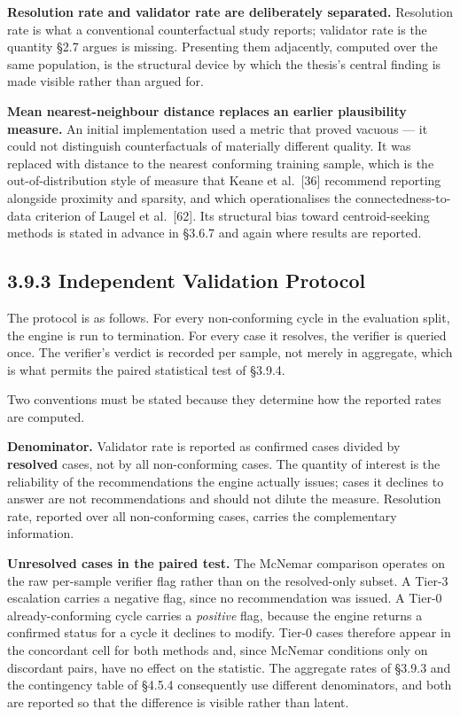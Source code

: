 \textbf{Resolution rate and validator rate are deliberately separated.} Resolution rate is what a conventional counterfactual study reports; validator rate is the quantity §2.7 argues is missing. Presenting them adjacently, computed over the same population, is the structural device by which the thesis's central finding is made visible rather than argued for.

\textbf{Mean nearest-neighbour distance replaces an earlier plausibility measure.} An initial implementation used a metric that proved vacuous --- it could not distinguish counterfactuals of materially different quality. It was replaced with distance to the nearest conforming training sample, which is the out-of-distribution style of measure that Keane et al.~{[}36{]} recommend reporting alongside proximity and sparsity, and which operationalises the connectedness-to-data criterion of Laugel et al.~{[}62{]}. Its structural bias toward centroid-seeking methods is stated in advance in §3.6.7 and again where results are reported.

\hypertarget{independent-validation-protocol}{%
\subsection{3.9.3 Independent Validation Protocol}\label{independent-validation-protocol}}

The protocol is as follows. For every non-conforming cycle in the evaluation split, the engine is run to termination. For every case it resolves, the verifier is queried once. The verifier's verdict is recorded per sample, not merely in aggregate, which is what permits the paired statistical test of §3.9.4.

Two conventions must be stated because they determine how the reported rates are computed.

\textbf{Denominator.} Validator rate is reported as confirmed cases divided by \textbf{resolved} cases, not by all non-conforming cases. The quantity of interest is the reliability of the recommendations the engine actually issues; cases it declines to answer are not recommendations and should not dilute the measure. Resolution rate, reported over all non-conforming cases, carries the complementary information.

\textbf{Unresolved cases in the paired test.} The McNemar comparison operates on the raw per-sample verifier flag rather than on the resolved-only subset. A Tier-3 escalation carries a negative flag, since no recommendation was issued. A Tier-0 already-conforming cycle carries a \emph{positive} flag, because the engine returns a confirmed status for a cycle it declines to modify. Tier-0 cases therefore appear in the concordant cell for both methods and, since McNemar conditions only on discordant pairs, have no effect on the statistic. The aggregate rates of §3.9.3 and the contingency table of §4.5.4 consequently use different denominators, and both are reported so that the difference is visible rather than latent.

